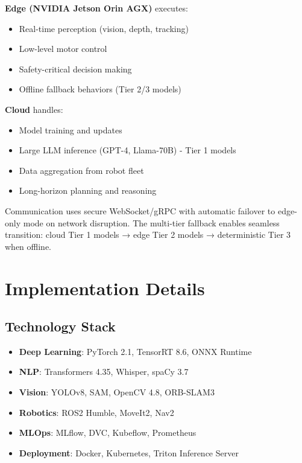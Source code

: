 \documentclass[conference]{IEEEtran}
\begin{document}
\textbf{Edge (NVIDIA Jetson Orin AGX)} executes:
\begin{itemize}
    \item Real-time perception (vision, depth, tracking)
    \item Low-level motor control
    \item Safety-critical decision making
    \item Offline fallback behaviors (Tier 2/3 models)
\end{itemize}

\textbf{Cloud} handles:
\begin{itemize}
    \item Model training and updates
    \item Large LLM inference (GPT-4, Llama-70B) - Tier 1 models
    \item Data aggregation from robot fleet
    \item Long-horizon planning and reasoning
\end{itemize}

Communication uses secure WebSocket/gRPC with automatic failover to edge-only mode on network disruption. The multi-tier fallback enables seamless transition: cloud Tier 1 models → edge Tier 2 models → deterministic Tier 3 when offline.

\section{Implementation Details}
\label{sec:implementation}

\subsection{Technology Stack}

\begin{itemize}
    \item \textbf{Deep Learning}: PyTorch 2.1, TensorRT 8.6, ONNX Runtime
    \item \textbf{NLP}: Transformers 4.35, Whisper, spaCy 3.7
    \item \textbf{Vision}: YOLOv8, SAM, OpenCV 4.8, ORB-SLAM3
    \item \textbf{Robotics}: ROS2 Humble, MoveIt2, Nav2
    \item \textbf{MLOps}: MLflow, DVC, Kubeflow, Prometheus
    \item \textbf{Deployment}: Docker, Kubernetes, Triton Inference Server
\end{itemize}
\end{document}
